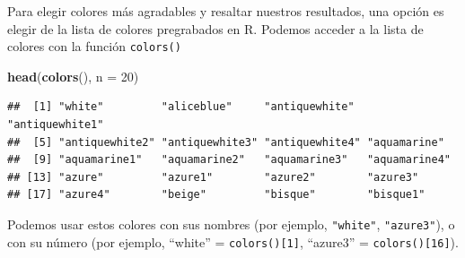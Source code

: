 \documentclass[
]{book}
\newenvironment{Shaded}{\begin{snugshade}}{\end{snugshade}}
\newcommand{\DataTypeTok}[1]{\textcolor[rgb]{0.13,0.29,0.53}{#1}}
\newcommand{\DecValTok}[1]{\textcolor[rgb]{0.00,0.00,0.81}{#1}}
\newcommand{\KeywordTok}[1]{\textcolor[rgb]{0.13,0.29,0.53}{\textbf{#1}}}
\newcommand{\NormalTok}[1]{#1}
\begin{document}
Para elegir colores más agradables y resaltar nuestros resultados, una opción es elegir de la lista de colores pregrabados en R. Podemos acceder a la lista de colores con la función \texttt{colors()}

\begin{Shaded}
\begin{Highlighting}[]
\KeywordTok{head}\NormalTok{(}\KeywordTok{colors}\NormalTok{(), }\DataTypeTok{n =} \DecValTok{20}\NormalTok{)}
\end{Highlighting}
\end{Shaded}

\begin{verbatim}
##  [1] "white"         "aliceblue"     "antiquewhite"  "antiquewhite1"
##  [5] "antiquewhite2" "antiquewhite3" "antiquewhite4" "aquamarine"   
##  [9] "aquamarine1"   "aquamarine2"   "aquamarine3"   "aquamarine4"  
## [13] "azure"         "azure1"        "azure2"        "azure3"       
## [17] "azure4"        "beige"         "bisque"        "bisque1"
\end{verbatim}

Podemos usar estos colores con sus nombres (por ejemplo, \texttt{"white"}, \texttt{"azure3"}), o con su número (por ejemplo, ``white'' = \texttt{colors(){[}1{]}}, ``azure3'' = \texttt{colors(){[}16{]}}).
\end{document}
